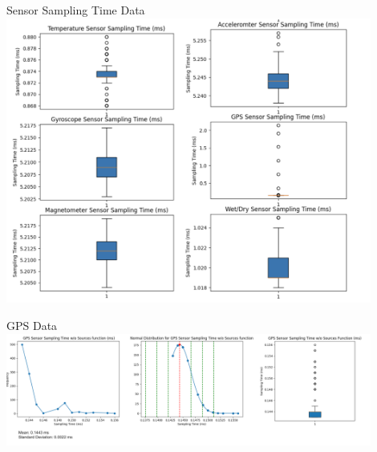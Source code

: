 \begin{frame}{Sensor Sampling Time Data}
    \centering
    \includegraphics[height=0.9\textheight,width=0.9\textwidth,keepaspectratio]{images/boxplots.png}
\end{frame}

\begin{frame}{GPS Data}
    \centering
    \includegraphics[height=0.9\textheight,width=0.9\textwidth,keepaspectratio]{images/gpsdata.png}
\end{frame}
